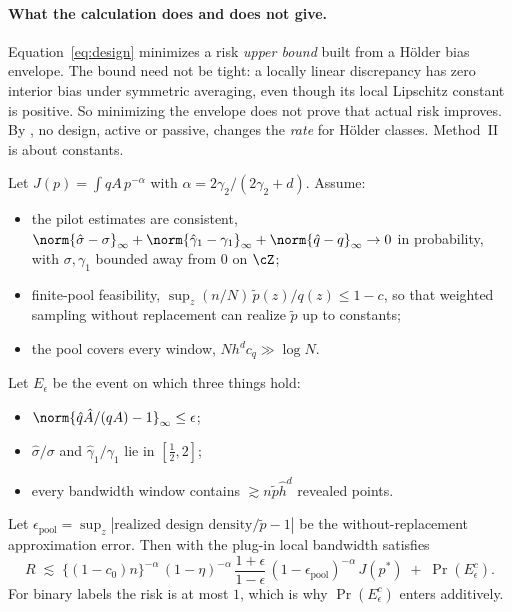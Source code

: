 \paragraph{What the calculation does and does not give.}
Equation~\eqref{eq:design} minimizes a risk \emph{upper bound} built from a H\"older bias envelope. The
bound need not be tight: a locally linear discrepancy has zero interior bias under symmetric
averaging, even though its local Lipschitz constant is positive. So minimizing the envelope does not
prove that actual risk improves. By \citet{castro2005faster}, no design, active or passive, changes
the \emph{rate} for H\"older classes. Method~II is about constants.

\begin{target}
\label{tr:design}
Let $J(p)=\int qA\,p^{-\alpha}$ with $\alpha=2\gamma_2/(2\gamma_2+d)$. Assume:
\begin{itemize}
  \item the pilot estimates are consistent,
        $\norm{\hat\sigma-\sigma}_\infty+\norm{\hat\gamma_1-\gamma_1}_\infty+\norm{\hat q-q}_\infty\to0$ in
        probability, with $\sigma,\gamma_1$ bounded away from $0$ on $\cZ$;
  \item finite-pool feasibility, $\sup_z(n/N)\,\tilde p(z)/q(z)\le1-c$, so that weighted sampling
        without replacement can realize $\tilde p$ up to constants;
  \item the pool covers every window, $Nh^dc_q\gg\log N$.
\end{itemize}
Let $E_\epsilon$ be the event on which three things hold:
\begin{itemize}
  \item $\norm{\hat q\hat A/(qA)-1}_\infty\le\epsilon$;
  \item $\hat\sigma/\sigma$ and $\hat\gamma_1/\gamma_1$ lie in $[\tfrac12,2]$;
  \item every bandwidth window contains $\gtrsim n\tilde p\hat h^d$ revealed points.
\end{itemize}
Let $\epsilon_{\mathrm{pool}}=\sup_z|\text{realized design density}/\tilde p-1|$ be the
without-replacement approximation error. Then \dfsp{} with the plug-in local bandwidth satisfies
\[
  R\;\lesssim\;\{(1-c_0)n\}^{-\alpha}\,(1-\eta)^{-\alpha}\,\frac{1+\epsilon}{1-\epsilon}\,
  (1-\epsilon_{\mathrm{pool}})^{-\alpha}\,J(p^{*})\;+\;\Pr(E_\epsilon^{c}).
\]
For binary labels the risk is at most $1$, which is why $\Pr(E_\epsilon^c)$ enters additively.
\end{target}

